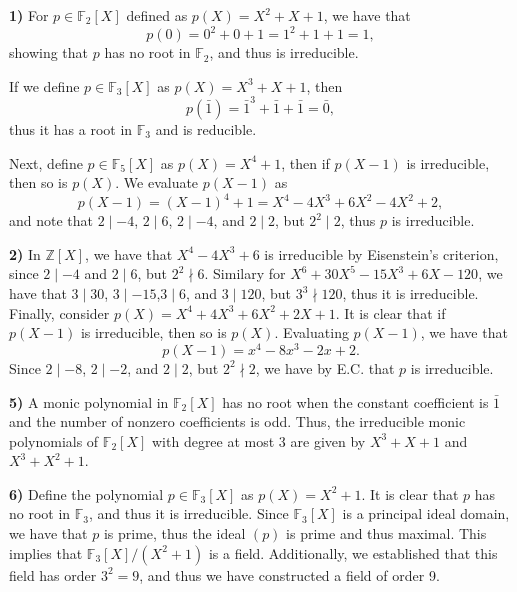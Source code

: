 \documentclass[12pt]{article}
\newcommand{\Z}{\ensuremath{\mathbb{Z}}}
\newcommand{\F}{\ensuremath{\mathbb{F}}}
\newcommand{\sectionskip}{\vspace{0.1in}}
\begin{document}
\textbf{1)}
For \( p \in \F_2[X] \) defined as \( p(X) = X^2 + X + 1 \), we have
that
\[
	p(0) = 0^2 + 0 + 1 = 1^2 + 1 + 1 = 1,
\]
showing that \( p \) has no root in \( \F_2 \), and thus is irreducible.

If we define \( p \in \F_3[X] \) as \( p(X) = X^3 + X + 1 \), then
\[
	p(\bar{1}) = \bar{1}^3 + \bar{1} + \bar{1} = \bar{0},
\]
thus it has a root in \( \F_3 \) and is reducible.

\pagebreak

Next, define \( p \in \F_5[X] \) as \( p(X) = X^4 + 1 \), then if
\( p(X - 1) \) is irreducible, then so is \( p(X) \).
We evaluate \( p(X - 1) \) as
\[
	p(X - 1) = (X - 1)^4 + 1 = X^4 - 4X^3 + 6X^2 - 4X^2 + 2,
\]
and note that \( 2 \mid -4 \), \( 2 \mid 6 \), \( 2 \mid -4 \), and
\( 2 \mid 2 \), but \( 2^2 \mid 2 \), thus \( p \) is irreducible.

\sectionskip

\textbf{2)}
In \( \Z[X] \), we have that \( X^4 - 4X^3 + 6 \) is irreducible by
Eisenstein's criterion, since \( 2 \mid -4 \) and \( 2 \mid 6 \), but
\( 2^2 \nmid 6 \).
Similary for \( X^6 + 30X^5 -15X^3 + 6X - 120 \), we have that
\( 3 \mid 30 \), \( 3 \mid -15 \),\( 3 \mid 6 \), and \( 3 \mid 120 \), but
\( 3^3 \nmid 120 \), thus it is irreducible.
Finally, consider \( p(X) = X^4 + 4X^3 + 6X^2 + 2X + 1 \).
It is clear that if \( p(X - 1) \) is irreducible, then so is \( p(X) \).
Evaluating \( p(X - 1) \), we have that
\[
	p(X - 1) = x^4 - 8x^3 - 2x + 2.
\]
Since \( 2 \mid -8 \), \( 2 \mid -2 \), and \( 2 \mid 2 \), but
\( 2^2 \nmid 2 \), we have by E.C. that \( p \) is irreducible.

\sectionskip

\textbf{5)}
A monic polynomial in \( \F_2[X] \) has no root when the constant coefficient
is \( \bar{1} \) and the number of nonzero coefficients is odd.
Thus, the irreducible monic polynomials of \( \F_2[X] \) with degree at most
3 are given by \( X^3 + X + 1 \) and \( X^3 + X^2 + 1 \).

\sectionskip

\textbf{6)}
Define the polynomial \( p \in \F_3[X] \) as \( p(X) = X^2 + 1 \).
It is clear that \( p \) has no root in \( \F_3 \), and thus it is
irreducible.
Since \( \F_3[X] \) is a principal ideal domain, we have that
\( p \) is prime, thus the ideal \( (p) \) is prime and thus maximal.
This implies that \( \F_3[X]/(X^2 + 1) \) is a field.
Additionally, we established that this field has order
\( 3^2 = 9 \), and thus we have constructed a field of order 9.
\end{document}
